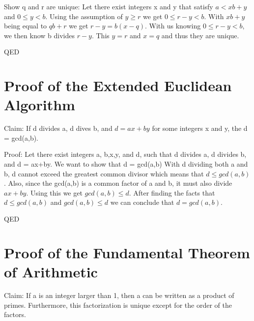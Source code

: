 \documentclass{article}
\begin{document}
Show q and r are unique: Let there exist integers x and y that satisfy $a < xb+ y$ and $0 \leq y < b$. Using the assumption of $y \geq r$ we get $0 \leq r -y < b$. With $xb+y$ being equal to $qb+r$ we get $r-y = b(x-q)$. With us knowing $0 \leq r-y < b$, we then know b divides $r-y$. This $y=r$ and $x = q$ and thus they are unique. 

QED

\pagebreak
\section{Proof of the Extended Euclidean Algorithm}
Claim: If d divides a, d dives b, and $d = ax+by$ for some integers x and y, the d = gcd(a,b).

Proof: Let there exist integers a, b,x,y, and d, such that d divides a, d divides b, and d = ax+by. We want to show that d = gcd(a,b) With d dividing both a and b, d cannot exceed the greatest common divisor which means that $d \leq gcd(a,b)$. Also, since the gcd(a,b) is a common factor of a and b, it must also divide $ax+by$. Using this we get $gcd(a,b) \leq d$. After finding the facts that $d \leq gcd(a,b)$ and $gcd(a,b) \leq d$ we can conclude that $d = gcd(a,b)$.

QED

\pagebreak
\section{Proof of the Fundamental Theorem of Arithmetic}
Claim: If a is an integer larger than 1, then a can be written as a product of primes.  Furthermore, this factorization is unique except for the order of the factors.
\end{document}
